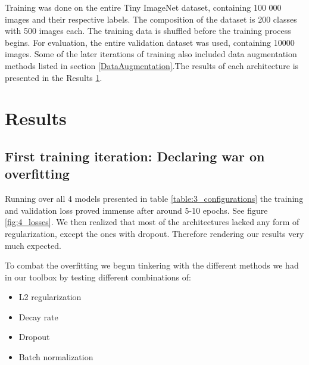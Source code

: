 \documentclass{kthreport}
\begin{document}

\FloatBarrier


Training was done on the entire Tiny ImageNet dataset, containing 100 000 images and their respective labels. The composition of the dataset is 200 classes with 500 images each. The training data is shuffled before the training process begins. For evaluation, the entire validation dataset was used, containing 10000 images. Some of the later iterations of training also included data augmentation methods listed in section \ref{DataAugmentation}.The results of each architecture is presented in the Results \ref{sec:Results}.


\section{Results}
\label{sec:Results}

\subsection{First training iteration: Declaring war on overfitting}

Running over all 4 models presented in table \ref{table:3_configurations} the training and validation loss proved immense after around 5-10 epochs. See figure \ref{fig:4_losses}. We then realized that most of the architectures lacked any form of regularization, except the ones with dropout. Therefore rendering our results very much expected.


\FloatBarrier

To combat the overfitting we begun tinkering with the different methods we had in our toolbox by testing different combinations of:

\begin{itemize}

  \item L2 regularization
  \item Decay rate
  \item Dropout
  \item Batch normalization

\end{itemize}
\end{document}
